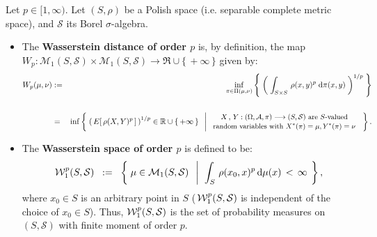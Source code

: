 \begin{definition}
\label{definition:WassersteinSpace}
\mbox{}\vskip 0.1cm
\noindent
Let $p \in [1,\infty)$.
Let $\left(S,\rho\right)$ be a Polish space (i.e. separable complete metric space),
and $\mathcal{S}$ its Borel $\sigma$-algebra.
\begin{itemize}
\item
	The \textbf{Wasserstein distance of order $p$} is, by definition, the map
	$W_{p} : \mathcal{M}_{1}\!\left(S,\mathcal{S}\right) \times \mathcal{M}_{1}\!\left(S,\mathcal{S}\right)
	\longrightarrow \Re\cup\{\,+\infty\,\}$
	given by:
	\begin{eqnarray*}
	W_{p}\!\left(\mu,\nu\right)
	& := &
	\inf_{\pi\in\Pi(\mu,\nu)}
	\left\{\;
	\left(\;
	\int_{S \times S}\,\rho(x,y)^{p} \;\textnormal{d}\pi(x,y)
	\;\right)^{1/p}
	\;\right\}
	\\ \\
	& = &
	\inf\left\{\;
	\left(\,E\!\left[\,\rho(X,Y)^{p}\,\right]\,\right)^{1/p} \in \mathbb{R}\cup\{\,+\infty\,\}
	\;\;\left\vert\;
	\begin{array}{c}
	\textnormal{\small$X\,,\,Y : (\Omega,\mathcal{A},\pi) \longrightarrow (S,\mathcal{S})$ are $S$-valued}
	\\
	\textnormal{\small random variables with $X^{*}(\pi) = \mu, Y^{*}(\pi) = \nu$}
	\end{array}
	\right.
	\;\right\}.
	\end{eqnarray*}
\item
	The \textbf{Wasserstein space of order $p$} is defined to be:
	\begin{equation*}
		\mathcal{W}^{p}_{1}\!\left(S,\mathcal{S}\right)
		\;\; := \;\;
		\left\{\;
		\mu \in \mathcal{M}_{1}\!\left(S,\mathcal{S}\right)
		\;\;\left\vert\;\;
		\int_{S}\,\rho(x_{0},x)^{p}\,\textnormal{d}\mu(x) \, < \, \infty
		\right.
		\;\right\},
	\end{equation*}
	where $x_{0} \in S$ is an arbitrary point in $S$
	(\,$\mathcal{W}^{p}_{1}\!\left(S,\mathcal{S}\right)$ is independent of the choice of $x_{0} \in S$).
	Thus, $\mathcal{W}^{p}_{1}\!\left(S,\mathcal{S}\right)$ is the set of probability measures
	on	$\left(S,\mathcal{S}\right)$ with finite moment of order $p$.
\end{itemize}
\end{definition}

